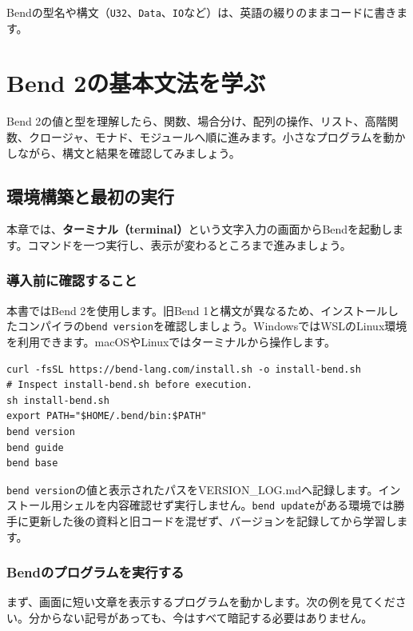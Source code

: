 \documentclass[11pt,a4paper,openany]{book}
\newcommand{\code}[1]{\texttt{#1}}
\newcommand{\file}[1]{\textsf{\color{blue}#1}}
\newcommand{\term}[1]{\textbf{#1}}
\newcommand{\readcode}[2]{}
\newcommand{\partchaptertoc}{%
  \begingroup
  \etocsetnexttocdepth{chapter}%
  \etocsettocstyle{%
    \vspace{2mm}\begin{tcolorbox}[colback=paper,colframe=blue!32,boxrule=.5pt,arc=2mm,
        title={\sffamily\bfseries このPartの目次},coltitle=ink,fonttitle=\sffamily\bfseries]
    \small\sffamily
  }{\end{tcolorbox}}%
  \localtableofcontents
  \endgroup
}
\begin{document}
\begin{pointbox}
Bendの型名や構文（\code{U32}、\code{Data}、\code{IO}など）は、英語の綴りのままコードに書きます。
\end{pointbox}

\tableofcontents
\mainmatter
\clearpage
\part{Bend 2の基本文法を学ぶ}
\partchaptertoc
\begin{pointbox}
Bend 2の値と型を理解したら、関数、場合分け、配列の操作、リスト、高階関数、クロージャ、モナド、モジュールへ順に進みます。小さなプログラムを動かしながら、構文と結果を確認してみましょう。
\end{pointbox}
\chapter{環境構築と最初の実行}
\begin{tcolorbox}[colback=blue!3,colframe=blue!16,boxrule=.35pt,arc=1mm,left=3mm,right=3mm,top=2mm,bottom=2mm]
\small 本章では、\term{ターミナル（terminal）}という文字入力の画面からBendを起動します。コマンドを一つ実行し、表示が変わるところまで進みましょう。
\end{tcolorbox}

\section{導入前に確認すること}
本書ではBend 2を使用します。旧Bend 1と構文が異なるため、インストールしたコンパイラの\code{bend version}を確認しましょう。WindowsではWSLのLinux環境を利用できます。macOSやLinuxではターミナルから操作します。

\begin{lstlisting}[language={},caption={導入、動作確認、一次資料の表示}]
curl -fsSL https://bend-lang.com/install.sh -o install-bend.sh
# Inspect install-bend.sh before execution.
sh install-bend.sh
export PATH="$HOME/.bend/bin:$PATH"
bend version
bend guide
bend base
\end{lstlisting}
\code{bend version}の値と表示されたパスを\file{VERSION\_LOG.md}へ記録します。インストール用シェルを内容確認せず実行しません。\code{bend update}がある環境では勝手に更新した後の資料と旧コードを混ぜず、バージョンを記録してから学習します。

\section{Bendのプログラムを実行する}
まず、画面に短い文章を表示するプログラムを動かします。次の例を見てください。分からない記号があっても、今はすべて暗記する必要はありません。
\readcode{01_hello.bend}{はじめてのBend 2（01\_hello.bend）}
\end{document}
